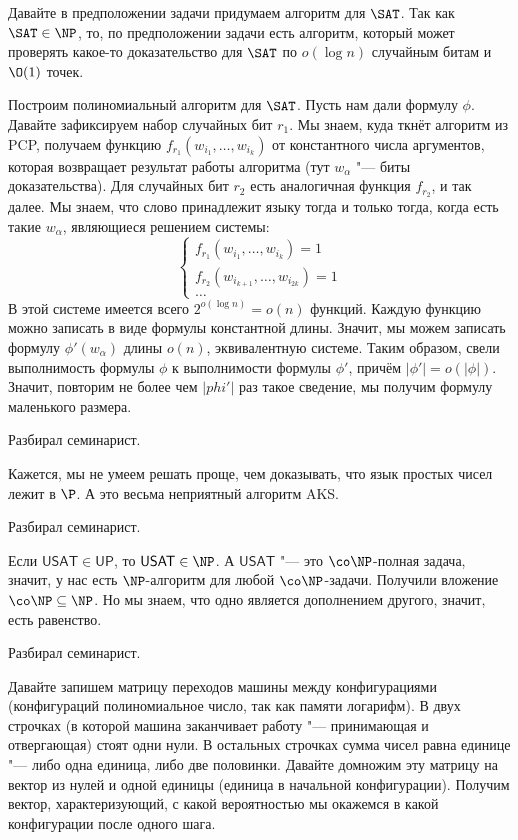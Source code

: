 	Давайте в предположении задачи придумаем алгоритм для $\SAT$.
	Так как $\SAT \in \NP$, то, по предположении задачи есть алгоритм, который
	может проверять какое-то доказательство для $\SAT$ по $o(\log n)$ случайным битам и $\O(1)$ точек.

	Построим полиномиальный алгоритм для $\SAT$.
	Пусть нам дали формулу $\phi$.
	Давайте зафиксируем набор случайных бит $r_1$.
	Мы знаем, куда ткнёт алгоритм из PCP, получаем функцию $f_{r_1}(w_{i_1}, \dots, w_{i_k})$ от константного
	числа аргументов, которая возвращает результат работы алгоритма (тут $w_{\alpha}$ "--- биты доказательства).
	Для случайных бит $r_2$ есть аналогичная функция $f_{r_2}$, и так далее.
	Мы знаем, что слово принадлежит языку тогда и только тогда, когда есть такие $w_{\alpha}$, являющиеся решением системы:
	\[
		\begin{cases}
			f_{r_1}(w_{i_1}, \dots, w_{i_k}) = 1 \\
			f_{r_2}(w_{i_{k+1}}, \dots, w_{i_{2k}}) = 1 \\
			\dots
		\end{cases}
	\]
	В этой системе имеется всего $2^{o(\log n)}=o(n)$ функций.
	Каждую функцию можно записать в виде формулы константной длины.
	Значит, мы можем записать формулу $\phi'(w_{\alpha})$ длины $o(n)$, эквивалентную системе.
	Таким образом, свели выполнимость формулы $\phi$ к выполнимости формулы $\phi'$, причём $|\phi'|=o(|\phi|)$.
	Значит, повторим не более чем $|phi'|$ раз такое сведение, мы получим формулу маленького размера.

	Разбирал семинарист.

	Кажется, мы не умеем решать проще, чем доказывать, что язык простых чисел лежит в $\P$.
	А это весьма неприятный алгоритм AKS.

	Разбирал семинарист.

	Если $\mathsf{USAT} \in \mathsf{UP}$, то $\mathsf{USAT} \in \NP$.
	А $\mathsf{USAT}$ "--- это $\co\NP$-полная задача, значит, у нас есть $\NP$-алгоритм для любой $\co\NP$-задачи.
	Получили вложение $\co\NP \subseteq \NP$.
	Но мы знаем, что одно является дополнением другого, значит, есть равенство.

	Разбирал семинарист.

	Давайте запишем матрицу переходов машины между конфигурациями (конфигураций полиномиальное число,
	так как памяти логарифм).
	В двух строчках (в которой машина заканчивает работу "--- принимающая и отвергающая) стоят одни нули.
	В остальных строчках сумма чисел равна единице "--- либо одна единица, либо две половинки.
	Давайте домножим эту матрицу на вектор из нулей и одной единицы (единица в начальной конфигурации).
	Получим вектор, характеризующий, с какой вероятностью мы окажемся в какой конфигурации после одного шага.

